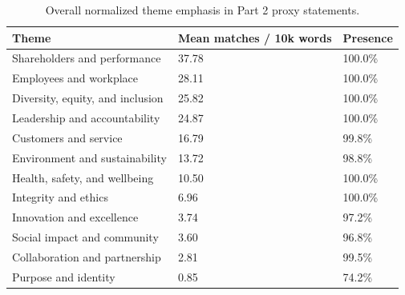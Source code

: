 \begin{table}[htbp]
\centering
\caption{Overall normalized theme emphasis in Part 2 proxy statements.}
\label{tab:overall_theme_emphasis}
\begin{tabular}{lll}
\hline
Theme & Mean matches / 10k words & Presence \\
\hline
Shareholders and performance & 37.78 & 100.0\% \\
Employees and workplace & 28.11 & 100.0\% \\
Diversity, equity, and inclusion & 25.82 & 100.0\% \\
Leadership and accountability & 24.87 & 100.0\% \\
Customers and service & 16.79 & 99.8\% \\
Environment and sustainability & 13.72 & 98.8\% \\
Health, safety, and wellbeing & 10.50 & 100.0\% \\
Integrity and ethics & 6.96 & 100.0\% \\
Innovation and excellence & 3.74 & 97.2\% \\
Social impact and community & 3.60 & 96.8\% \\
Collaboration and partnership & 2.81 & 99.5\% \\
Purpose and identity & 0.85 & 74.2\% \\
\hline
\end{tabular}
\end{table}
